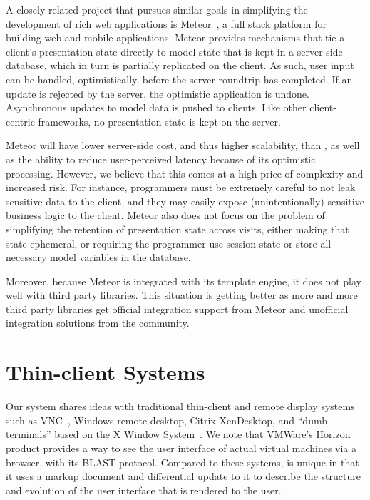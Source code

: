 A closely related project that pursues similar goals in simplifying the development
of rich web applications is Meteor~\cite{meteor}, a full stack platform for building 
web and mobile applications.  Meteor provides mechanisms that tie a client's presentation
state directly to model state that is kept in a server-side database, which in turn is 
partially replicated on the client.  As such, user input can be handled, optimistically, before 
the server roundtrip has completed. If an update is rejected by the server, the optimistic 
application is undone. 
Asynchronous updates to model data is pushed to clients.
Like other client-centric frameworks, no presentation state is kept on
the server. 

Meteor will have lower server-side cost, and thus higher scalability, than \cb, as well
as the ability to reduce user-perceived latency because of its optimistic processing.
However, we believe that this comes at a high price of complexity and increased risk.
For instance, programmers must be extremely careful to not leak sensitive data to the 
client, and they may easily expose (unintentionally) sensitive business logic to the client.  
Meteor also does not focus on the problem of simplifying the retention of presentation
state across visits, either making that state ephemeral, or requiring the programmer
use session state or store all necessary model variables in the database.

Moreover, because Meteor is integrated with its template engine, it does not play well
with third party \js libraries. This situation is getting better as more and more third
party libraries get official integration support from Meteor and unofficial integration
solutions from the community.


\section{Thin-client Systems}

Our system shares ideas with traditional thin-client and remote display 
systems such as VNC~\cite{richardson1998virtual}, Windows remote desktop, 
Citrix XenDesktop, and 
``dumb terminals'' based on the X Window  System~\cite{ScheiflerGettys:acmtg1986}.  
We note that VMWare's Horizon product provides
a way to see the user interface of actual virtual machines via a browser, with its
BLAST protocol.  Compared to these systems, \cb{} is 
unique in that it uses a markup document and differential update to it to 
describe the structure and evolution of the user interface that is rendered 
to the user.  

